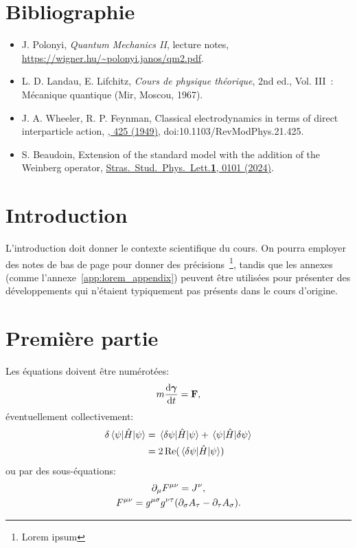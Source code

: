 \documentclass[
 reprint,
 unsortedaddress,
 preprintnumbers,
 nobibnotes,
 nofootinbib,
 longbibliography,
 amsmath,amssymb,
 aps,pra,
 onecolumn
]{revtex4-2}
\def\sspl{Stras.\ Stud.\ Phys.\ Lett.}%
\begin{document}
\tableofcontents


\section*{Bibliographie}

\begin{itemize}
    \item J. Polonyi, \textit{Quantum Mechanics II}, lecture notes, \url{https://wigner.hu/~polonyi.janos/qm2.pdf}.
    \item L. D. Landau, E. Lifchitz, \textit{Cours de physique théorique}, 2nd ed., Vol. III~: Mécanique quantique (Mir, Moscou, 1967).
    \item J. A. Wheeler, R. P. Feynman, Classical electrodynamics in terms of direct interparticle action, \href{https://doi.org/10.1103/RevModPhys.21.425}{, 425 (1949)}, doi:10.1103/RevModPhys.21.425.
    \item S. Beaudoin, Extension of the standard model with the addition of the Weinberg operator, \href{https://www.2spl.fr/web/content/607?unique=b4cea604932e47fba8e553dd3b51e55ddadd3f09}{\sspl {\bf 1}, 0101 (2024)}.
\end{itemize}

\section*{Introduction}

L'introduction doit donner le contexte scientifique du cours. On pourra employer des notes de bas de page pour donner des précisions~\footnote{Lorem ipsum}, tandis que les annexes (comme l'annexe~\ref{app:lorem_appendix}) peuvent être utilisées pour présenter des développements qui n'étaient typiquement pas présents dans le cours d'origine.

\section{Première partie}

Les équations doivent être numérotées:
\begin{equation}
    m \dv{\bm\gamma}{t} = \mathbf{F} ,
\end{equation}
éventuellement collectivement:
\begin{equation}
\begin{split}
    \delta \expval{\hat{H}}{\psi} &= \mel{\delta \psi}{\hat{H}}{\psi} + \mel{\psi}{\hat{H}}{\delta \psi} \\
    &= 2 \Re(\mel{\delta \psi}{\hat{H}}{\psi})
\end{split}
\end{equation}
ou par des sous-équations:
\begin{subequations}
\begin{gather}
    \partial_\mu F^{\mu\nu} = J^\nu, \\
    F^{\mu\nu} = g^{\mu\sigma} g^{\nu\tau} \pqty{ \partial_\sigma A_\tau - \partial_\tau A_\sigma }.
\end{gather}
\end{subequations}
\end{document}
